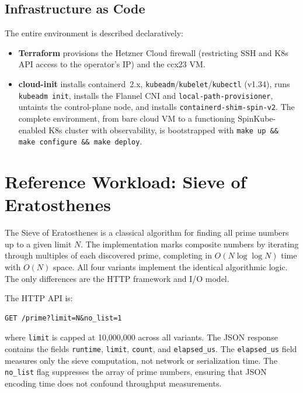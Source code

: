 \subsection{Infrastructure as Code}

The entire environment is described declaratively:

\begin{itemize}
    \item \textbf{Terraform} provisions the Hetzner Cloud firewall (restricting \acs{SSH} and \acs{K8s} \acs{API} access to the operator's \acs{IP}) and the ccx23 \acs{VM}.
    \item \begin{sloppypar}\textbf{cloud-init} installs containerd~2.x, \texttt{kubeadm}/\texttt{kubelet}/\texttt{kubectl} (v1.34), runs \texttt{kubeadm init}, installs the Flannel \acs{CNI} and \texttt{local-path-provisioner}, untaints the control-plane node, and installs \texttt{containerd-shim-spin-v2}. The complete environment, from bare cloud \acs{VM} to a functioning SpinKube-enabled \acs{K8s} cluster with observability, is bootstrapped with \texttt{make up \&\& make configure \&\& make deploy}.\end{sloppypar}
\end{itemize}

\section{Reference Workload: Sieve of Eratosthenes}
\label{sec:reference_workload}

The Sieve of Eratosthenes is a classical algorithm for finding all prime numbers up to a given limit $N$. The implementation marks composite numbers by iterating through multiples of each discovered prime, completing in $O(N \log \log N)$ time with $O(N)$ space. All four variants implement the identical algorithmic logic. The only differences are the \acs{HTTP} framework and I/O model.

The \acs{HTTP} \acs{API} is:
\begin{verbatim}
GET /prime?limit=N&no_list=1
\end{verbatim}
\begin{sloppypar}
where \texttt{limit} is capped at 10,000,000 across all variants. The \acs{JSON} response contains the fields \texttt{runtime}, \texttt{limit}, \texttt{count}, and \texttt{elapsed\_us}. The \texttt{elapsed\_us} field measures only the sieve computation, not network or serialization time. The \texttt{no\_list} flag suppresses the array of prime numbers, ensuring that \acs{JSON} encoding time does not confound throughput measurements.
\end{sloppypar}

